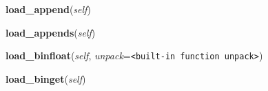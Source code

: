 \hspace{.8\funcindent}\begin{boxedminipage}{\funcwidth}

    \raggedright \textbf{load\_append}(\textit{self})

\setlength{\parskip}{2ex}
\setlength{\parskip}{1ex}
    \end{boxedminipage}

    \label{pickle:Unpickler:load_appends}

    \vspace{0.5ex}

\hspace{.8\funcindent}\begin{boxedminipage}{\funcwidth}

    \raggedright \textbf{load\_appends}(\textit{self})

\setlength{\parskip}{2ex}
\setlength{\parskip}{1ex}
    \end{boxedminipage}

    \label{pickle:Unpickler:load_binfloat}

    \vspace{0.5ex}

\hspace{.8\funcindent}\begin{boxedminipage}{\funcwidth}

    \raggedright \textbf{load\_binfloat}(\textit{self}, \textit{unpack}={\tt {\textless}built-in function unpack{\textgreater}})

\setlength{\parskip}{2ex}
\setlength{\parskip}{1ex}
    \end{boxedminipage}

    \label{pickle:Unpickler:load_binget}

    \vspace{0.5ex}

\hspace{.8\funcindent}\begin{boxedminipage}{\funcwidth}

    \raggedright \textbf{load\_binget}(\textit{self})

\setlength{\parskip}{2ex}
\setlength{\parskip}{1ex}
    \end{boxedminipage}

    \label{pickle:Unpickler:load_binint}

